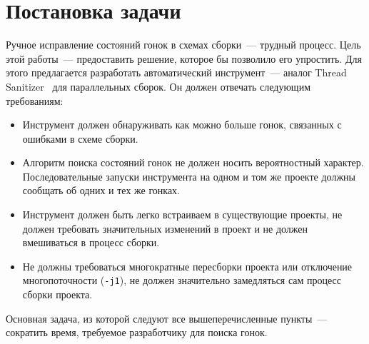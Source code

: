 \section{Постановка задачи}
\label{sec:Chapter1} 


Ручное исправление состояний гонок в схемах сборки~--- трудный процесс. Цель этой работы~--- предоставить решение, которое бы позволило его упростить. Для этого предлагается разработать автоматический инструмент~--- аналог Thread Sanitizer~\cite{35604} для параллельных сборок. Он должен отвечать следующим требованиям:

\begin{itemize}
	\item Инструмент должен обнаруживать как можно больше гонок, связанных с ошибками в схеме сборки.
	\item Алгоритм поиска состояний гонок не должен носить вероятностный характер. Последовательные запуски инструмента на одном и том же проекте должны сообщать об одних и тех же гонках. 
	\item Инструмент должен быть легко встраиваем в существующие проекты, не должен требовать значительных изменений в проект и не должен вмешиваться в процесс сборки. 
	\item Не должны требоваться многократные пересборки проекта или отключение многопоточности (\texttt{-j1}), не должен значительно замедляться сам процесс сборки проекта.
\end{itemize}

Основная задача, из которой следуют все вышеперечисленные пункты~--- сократить время, требуемое разработчику для поиска гонок.
